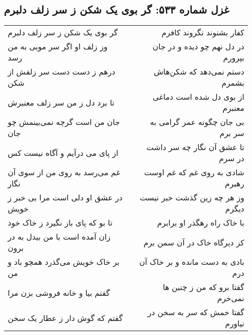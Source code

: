 \begin{center}
\section*{غزل شماره ۵۳۳: گر بوی یک شکن ز سر زلف دلبرم}
\label{sec:533}
\begin{longtable}{l p{0.5cm} r}
گر بوی یک شکن ز سر زلف دلبرم
&&
کفار بشنوند نگروند کافرم
\\
وز زلف او اگر سر مویی به من رسد
&&
در دل نهم چو دیده و در جان بپرورم
\\
درهم ز دست دست سر زلفش از شکن
&&
دستم نمی‌دهد که شکن‌هاش بشمرم
\\
تا برد دل ز من سر زلف معنبرش
&&
از بوی دل شده است دماغی معنبرم
\\
جان من است گرچه نمی‌بینمش چو جان
&&
بی جان چگونه عمر گرامی به سر برم
\\
از پای می درآیم و آگاه نیست کس
&&
تا عشق آن نگار چه سر داشت در سرم
\\
غم می‌رسد به روی من از سوی آن نگار
&&
شادی به روی غم که غم اوست رهبرم
\\
در عشق او دلی است مرا بی خبر ز خویش
&&
وز هر چه زین گذشت خبر نیست دیگرم
\\
تا بو که پای باز نگیرد ز خاک خود
&&
با خاک راه رهگذر او برابرم
\\
زان آمده است با من بیدل به در برون
&&
کز دیرگاه خاک در آن سمن برم
\\
بر خاک خویش می‌گذرد همچو باد و من
&&
بادی به دست مانده و بر خاک آن درم
\\
گفتم بیا و خانه فروشی بزن مرا
&&
گفتا برو که من ز چنین ها نمی‌خرم
\\
گفتم که گوش دار ز عطار یک سخن
&&
گفتا خمش که سر به سخن در نیاورم
\\
\end{longtable}
\end{center}
